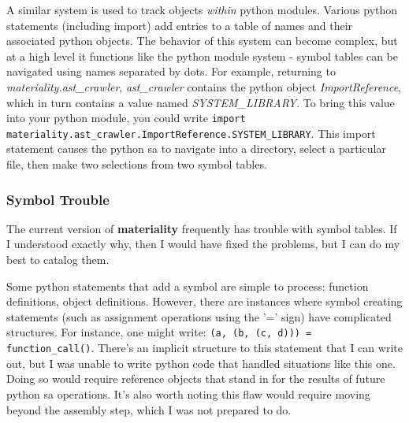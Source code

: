 \documentclass[a4paper,man,natbib,floatsintext]{apa6}
\begin{document}
  A similar system is used to track objects \textit{within} \Gls{python} modules. Various \Gls{python} statements (including import) add entries to a table of names and their associated \Gls{python} objects. The behavior of this system can become complex, but at a high level it functions like the \Gls{python} module system - symbol tables can be navigated using names separated by dots. For example, returning to \textit{materiality.ast\_crawler}, \textit{ast\_crawler} contains the \Gls{python} object \textit{ImportReference}, which in turn contains a value named \textit{SYSTEM\_LIBRARY}\footnotemark. To bring this value into your python module, you could write \verb|import materiality.ast_crawler.ImportReference.SYSTEM_LIBRARY|. This import statement causes the \Gls{python} \gls{sa} to navigate into a directory, select a particular file, then make two selections from two symbol tables. 


  \subsubsection{Symbol Trouble}
  The current version of \textbf{materiality} frequently has trouble with symbol tables. If I understood exactly why, then I would have fixed the problems, but I can do my best to catalog them.

  Some \Gls{python} statements that add a symbol are simple to process: function definitions, object definitions. However, there are instances where symbol creating statements (such as assignment operations using the '=' sign) have complicated structures. For instance, one might write: \verb|(a, (b, (c, d))) = function_call()|. There's an implicit structure to this statement that I can write out\footnotemark, but I was unable to write \Gls{python} code that handled situations like this one. Doing so would require reference objects that stand in for the results of future \Gls{python} \gls{sa} operations. It's also worth noting this flaw would require moving beyond the assembly step, which I was not prepared to do.

\end{document}
